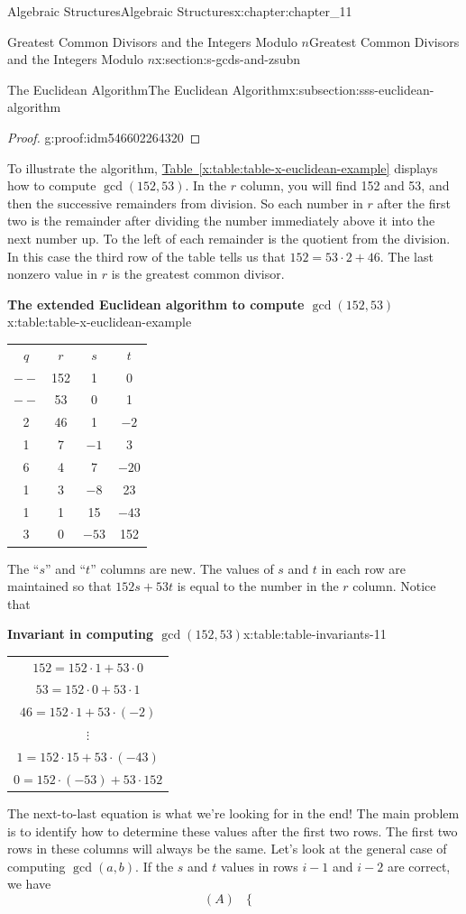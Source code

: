 \documentclass[oneside,10pt,]{book}
\newcommand{\tabularfont}{\relax}
\newcommand{\xreffont}{\relax}
\numberwithin{equation}{section}
\newcommand{\hrulethick} {\noalign{\hrule height 0.11em}}
\begin{document}
\begin{chapterptx}{Algebraic Structures}{}{Algebraic Structures}{}{}{x:chapter:chapter_11}
\begin{sectionptx}{Greatest Common Divisors  and the Integers Modulo \(n\)}{}{Greatest Common Divisors  and the Integers Modulo \(n\)}{}{}{x:section:s-gcds-and-zsubn}
\begin{subsectionptx}{The Euclidean Algorithm}{}{The Euclidean Algorithm}{}{}{x:subsection:sss-euclidean-algorithm}
\begin{proof}{}{g:proof:idm546602264320}
\end{proof}
To illustrate the algorithm, \hyperref[x:table:table-x-euclidean-example]{Table~{\xreffont\ref{x:table:table-x-euclidean-example}}} displays how to compute \(\gcd(152,53)\).   In the \(r\) column, you will find 152 and 53, and then the successive remainders from division.  So each number in \(r\) after the first two is the remainder after dividing the number immediately above it into the next number up.  To the left of each remainder is the quotient from the division.  In this case the third row of the table tells us that \(152 = 53\cdot 2 + 46\). The last nonzero value in \(r\) is the greatest common divisor.%
\begin{tableptx}{\textbf{The extended Euclidean algorithm to compute \(\gcd(152,53)\)}}{x:table:table-x-euclidean-example}{}%
\centering
{\tabularfont%
\begin{tabular}{cccc}\hrulethick
\(q\)&\(r\)&\(s\)&\(t\)\tabularnewline[0pt]
\(--\)&152&1&0\tabularnewline[0pt]
\(--\)&53&0&1\tabularnewline[0pt]
2&46&1&\(-2\)\tabularnewline[0pt]
1&7&\(-1\)&3\tabularnewline[0pt]
6&4&7&\(-20\)\tabularnewline[0pt]
1&3&\(-8\)&23\tabularnewline[0pt]
1&1&15&\(-43\)\tabularnewline[0pt]
3&0&\(-53\)&152
\end{tabular}
}%
\end{tableptx}%
The ``\(s\)'' and ``\(t\)'' columns are new.  The values of \(s\) and \(t\) in each row are maintained so that \(152s + 53t\) is equal to the number in the \(r\) column.   Notice that%
\begin{tableptx}{\textbf{Invariant in computing \(\gcd(152,53)\)}}{x:table:table-invariants-11}{}%
\centering
{\tabularfont%
\begin{tabular}{c}
\(152 = 152\cdot 1+ 53\cdot 0\)\tabularnewline[0pt]
\(53 =152\cdot 0 + 53\cdot 1\)\tabularnewline[0pt]
\(46 = 152\cdot 1 + 53\cdot (-2)\)\tabularnewline[0pt]
\(\vdots\)\tabularnewline[0pt]
\(1 = 152\cdot 15 + 53\cdot (-43)\)\tabularnewline[0pt]
\(0 = 152 \cdot (-53) + 53\cdot 152\)
\end{tabular}
}%
\end{tableptx}%
The next-to-last equation is what we're looking for in the end!  The main problem is to identify how to determine these values after the first two rows.  The first two rows in these columns will always be the same. Let's look at the general case of computing \(\gcd(a,b)\).  If the \(s\) and \(t\) values in rows \(i - 1\) and  \(i - 2\) are correct, we have%
\begin{equation*}
(A)\textrm{        }\left\{
\begin{array}{c}

\end{array}
\end{equation*}
\end{subsectionptx}
\end{sectionptx}
\end{chapterptx}
\end{document}
